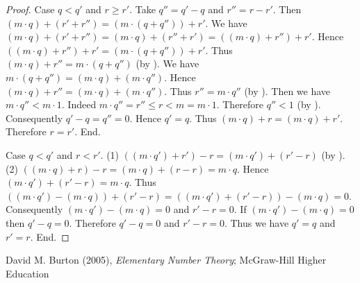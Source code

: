 \documentclass{article}
\begin{document}
\begin{forthel}
\begin{proof}
      Case $q < q'$ and $r \geq r'$.
        Take $q'' = q' - q$ and $r'' = r - r'$.
        Then $(m \cdot q) + (r' + r'') = (m \cdot (q + q'')) + r'$.
        We have $(m \cdot q) + (r' + r'')
          = (m \cdot q) + (r'' + r')
          = ((m \cdot q) + r'') + r'$.
        Hence $((m \cdot q) + r'') + r' = (m \cdot (q + q'')) + r'$.
        Thus $(m \cdot q) + r'' = m \cdot (q + q'')$ (by ).
        We have $m \cdot (q + q'') = (m \cdot q) + (m \cdot q'')$.
        Hence $(m \cdot q) + r'' = (m \cdot q) + (m \cdot q'')$.
        Thus $r'' = m \cdot q''$ (by ).
        Then we have $m \cdot q'' < m \cdot 1$.
        Indeed $m \cdot q''
          = r''
          \leq r
          < m
          = m \cdot 1$.
        Therefore $q'' < 1$ (by ).
        Consequently $q' - q = q'' = 0$.
        Hence $q' = q$.
        Thus $(m \cdot q) + r = (m \cdot q) + r'$.
        Therefore $r = r'$.
      End.

      Case $q < q'$ and $r < r'$.
        (1) $((m \cdot q') + r') - r = (m \cdot q') + (r' - r)$ (by ).
        (2) $((m \cdot q) + r) - r
          = (m \cdot q) + (r - r)
          = m \cdot q$.
        Hence $(m \cdot q') + (r' - r) = m \cdot q$.
        Thus $((m \cdot q') - (m \cdot q)) + (r' - r)
          = ((m \cdot q') + (r' - r)) - (m \cdot q)
          = 0$.
        Consequently $(m \cdot q') - (m \cdot q) = 0$ and $r' - r = 0$.
        If $(m \cdot q') - (m \cdot q) = 0$ then $q' - q = 0$.
        Therefore $q' - q = 0$ and $r' - r = 0$.
        Thus we have $q' = q$ and $r' = r$.
      End.
    \end{proof}
  \end{forthel}

  \begin{thebibliography}{1}
     David M. Burton (2005),
      \textit{Elementary Number Theory};
      McGraw-Hill Higher Education
  \end{thebibliography}
\end{document}
